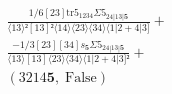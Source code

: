 \documentclass[varwidth, border=5pt]{standalone}
\newcommand{\trfive}{\text{tr5}}
\begin{document}
\begin{my}
$\begin{gathered}
\scriptscriptstyle\frac{1/6[23]\trfive_{1234}Σ5_{24|13|𝟓}}{⟨13⟩²[13]²⟨14⟩⟨23⟩⟨34⟩⟨1|2+4|3]} +\\
\scriptscriptstyle\frac{-1/3[23][34]s_{𝟓}Σ5_{24|13|𝟓}}{⟨13⟩[13]⟨23⟩⟨34⟩⟨1|2+4|3]²} +\\
\scriptscriptstyle(3214𝟓,\;\text{False}) \phantom{+}
\end{gathered}$
\end{my}
\end{document}
